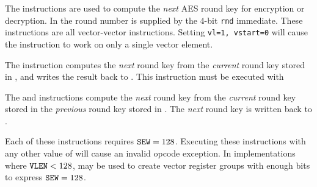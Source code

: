 The  instructions
are used to compute the {\em next} AES round key for encryption
or decryption.
In the round number is supplied by the $4$-bit {\tt rnd} immediate.
These instructions are all vector-vector instructions.
Setting {\tt vl=1, vstart=0} will cause the instruction to work on only a
single vector element.

The  instruction computes
the {\em next} round key
from the
{\em current} round key
stored in \vrt,
and writes the result back to \vrt.
This instruction must be executed with \SEW

The  and  instructions
compute the {\em next} round key
from the
{\em current} round key stored in 
the {\em previous} round key stored in .
The {\em next} round key is written back to \vrt.

Each of these instructions requires ${\tt SEW}=128$.
Executing these instructions with any other value of \SEW will cause
an invalid opcode exception.
In implementations where ${\tt VLEN}<128$, \LMUL may be used to create
vector register groups with enough bits to express ${\tt SEW}=128$.

%
%
%
%
%
%
%
%
%
%
%
%
%

